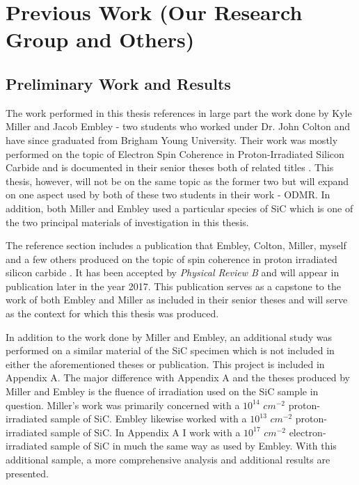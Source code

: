 \documentclass[oneside, astronomy, noacknowlegments]{BYUPhys}
\begin{document}
\section{Previous Work (Our Research Group and Others)}

\subsection{Preliminary Work and Results}

The work performed in this thesis references in large part the work done by Kyle Miller and Jacob Embley - two students who worked under Dr. John Colton and have since graduated from Brigham Young University. Their work was mostly performed on the topic of Electron Spin Coherence in Proton-Irradiated Silicon Carbide and is documented in their senior theses both of related titles \cite{RefWorks:doc:5892989ee4b0499fa95c51c8} \cite{RefWorks:doc:5892912ae4b0dec22aee3993}. This thesis, however, will not be on the same topic as the former two but will expand on one aspect used by both of these two students in their work - ODMR. In addition, both Miller and Embley used a particular species of SiC which is one of the two principal materials of investigation in this thesis.

The reference section includes a publication that Embley, Colton, Miller, myself and a few others produced on the topic of spin coherence in proton irradiated silicon carbide \cite{RefWorks:doc:58929128e4b0499fa95c5064}. It has been accepted by \textit{Physical Review B} and will appear in publication later in the year 2017. This publication serves as a capstone to the work of both Embley and Miller as included in their senior theses and will serve as the context for which this thesis was produced.

In addition to the work done by Miller and Embley, an additional study was performed on a similar material of the SiC specimen which is not included in either the aforementioned theses or publication. This project is included in Appendix A. The major difference with Appendix A and the theses produced by Miller and Embley is the fluence of irradiation used on the SiC sample in question. Miller's work was primarily concerned with a $10^{14}$ $cm^{-2}$ proton-irradiated sample of SiC. Embley likewise worked with a $10^{13}$ $cm^{-2}$ proton-irradiated sample of SiC. In Appendix A I work with a $10^{17}$ $cm^{-2}$ electron-irradiated sample of SiC in much the same way as used by Embley. With this additional sample, a more comprehensive analysis and additional results are presented.
\end{document}
